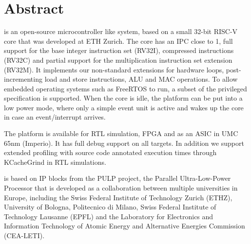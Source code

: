 
\chapter*{Abstract}
\pulpino is an open-source microcontroller like system, based on a small 32-bit RISC-V core that was developed at ETH Zurich. The core has an IPC close to 1, full support for the base integer instruction set (RV32I), compressed instructions (RV32C) and partial support for the multiplication instruction set extension (RV32M). It implements our non-standard extensions for hardware loops, post-incrementing load and store instructions, ALU and MAC operations. To allow embedded operating systems such as FreeRTOS to run, a subset of the privileged specification is supported. When the core is idle, the platform can be put into a low power mode, where only a simple event unit is active and wakes up the core in case an event/interrupt arrives.

The \pulpino platform is available for RTL simulation, FPGA and as an ASIC in UMC 65nm (Imperio). It has full debug support on all targets. In addition we support extended profiling with source code annotated execution times through KCacheGrind in RTL simulations.

\pulpino is based on IP blocks from the PULP project, the Parallel Ultra-Low-Power Processor that is developed as a collaboration between multiple universities in Europe, including the Swiss Federal Institute of Technology Zurich (ETHZ), University of Bologna, Politecnico di Milano, Swiss Federal Institute of Technology Lausanne (EPFL) and the Laboratory for Electronics and Information Technology of Atomic Energy and Alternative Energies Commission (CEA-LETI).
